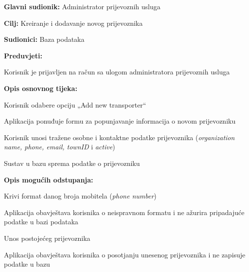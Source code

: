 					
					\noindent {}
					\begin{packed_item}
						\item \textbf{Glavni sudionik:} Administrator prijevoznih usluga
						\item  \textbf{Cilj:} Kreiranje i dodavanje novog prijevoznika
						\item  \textbf{Sudionici:} Baza podataka
						\item  \textbf{Preduvjeti:}
						\item[] \begin{packed_enum}
							\item Korisnik je prijavljen na račun sa ulogom administratora prijevoznih usluga
						\end{packed_enum}
						
						\item  \textbf{Opis osnovnog tijeka:}
						\item[] \begin{packed_enum}
							\item Korisnik odabere opciju „Add new transporter“
							\item Aplikacija ponuđuje formu za popunjavanje informacija o novom prijevozniku
							\item Korisnik unosi tražene osobne i kontaktne podatke prijevoznika (\textit{organization name, phone, email, townID} i \textit{active})
							\item Sustav u bazu sprema podatke o prijevozniku
						\end{packed_enum}
						
						\item  \textbf{Opis mogućih odstupanja:}
						\item[] \begin{packed_item}
							\item[3.a] Krivi format danog broja mobitela (\textit{phone number})
							\item[] \begin{packed_enum}
								\item Aplikacija obavještava korisnika o neispravnom formatu i ne ažurira pripadajuće podatke u bazi podataka
							\end{packed_enum}
							\item[3.b] Unos postojećeg prijevoznika
							\item[] \begin{packed_enum}
								\item Aplikacija obavještava korisnika o posotjanju unesenog prijevoznika i ne zapisuje podatke u bazu
							\end{packed_enum}
						\end{packed_item}
					\end{packed_item}
					
